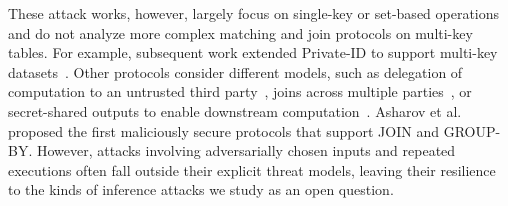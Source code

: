 These attack works, however, largely focus on single-key or set-based operations and do not analyze more complex matching and join protocols on multi-key tables. For example, subsequent work extended Private-ID to support multi-key datasets~\cite{MKPMC}. Other protocols consider different models, such as delegation of computation to an untrusted third party~\cite{PoPETS:MMTSBC24}, joins across multiple parties~\cite{PoPETS:LehMouSid26}, or secret-shared outputs to enable downstream computation~\cite{CCS:MohRinRos20,IDCloak}. Asharov et al.~\cite{CCS:AHKNPT23} proposed the first maliciously secure protocols that support JOIN and GROUP-BY. However, attacks involving adversarially chosen inputs and repeated executions often fall outside their explicit threat models, leaving their resilience to the kinds of inference attacks we study as an open question.
